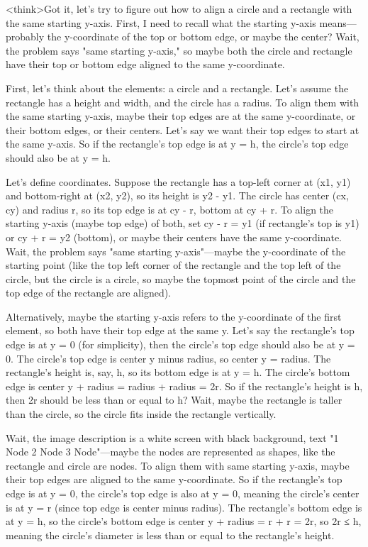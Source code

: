 <think>Got it, let's try to figure out how to align a circle and a rectangle with the same starting y-axis. First, I need to recall what the starting y-axis means—probably the y-coordinate of the top or bottom edge, or maybe the center? Wait, the problem says "same starting y-axis," so maybe both the circle and rectangle have their top or bottom edge aligned to the same y-coordinate. 

First, let's think about the elements: a circle and a rectangle. Let's assume the rectangle has a height and width, and the circle has a radius. To align them with the same starting y-axis, maybe their top edges are at the same y-coordinate, or their bottom edges, or their centers. Let's say we want their top edges to start at the same y-axis. So if the rectangle's top edge is at y = h, the circle's top edge should also be at y = h. 

Let's define coordinates. Suppose the rectangle has a top-left corner at (x1, y1) and bottom-right at (x2, y2), so its height is y2 - y1. The circle has center (cx, cy) and radius r, so its top edge is at cy - r, bottom at cy + r. To align the starting y-axis (maybe top edge) of both, set cy - r = y1 (if rectangle's top is y1) or cy + r = y2 (bottom), or maybe their centers have the same y-coordinate. Wait, the problem says "same starting y-axis"—maybe the y-coordinate of the starting point (like the top left corner of the rectangle and the top left of the circle, but the circle is a circle, so maybe the topmost point of the circle and the top edge of the rectangle are aligned). 

Alternatively, maybe the starting y-axis refers to the y-coordinate of the first element, so both have their top edge at the same y. Let's say the rectangle's top edge is at y = 0 (for simplicity), then the circle's top edge should also be at y = 0. The circle's top edge is center y minus radius, so center y = radius. The rectangle's height is, say, h, so its bottom edge is at y = h. The circle's bottom edge is center y + radius = radius + radius = 2r. So if the rectangle's height is h, then 2r should be less than or equal to h? Wait, maybe the rectangle is taller than the circle, so the circle fits inside the rectangle vertically. 

Wait, the image description is a white screen with black background, text "1 Node 2 Node 3 Node"—maybe the nodes are represented as shapes, like the rectangle and circle are nodes. To align them with same starting y-axis, maybe their top edges are aligned to the same y-coordinate. So if the rectangle's top edge is at y = 0, the circle's top edge is also at y = 0, meaning the circle's center is at y = r (since top edge is center minus radius). The rectangle's bottom edge is at y = h, so the circle's bottom edge is center y + radius = r + r = 2r, so 2r ≤ h, meaning the circle's diameter is less than or equal to the rectangle's height. 

